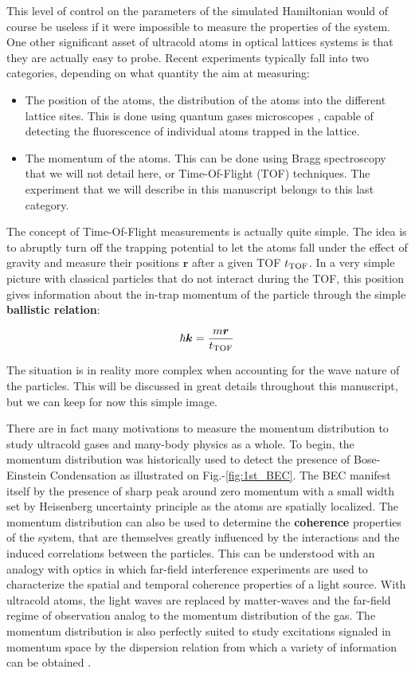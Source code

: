 This level of control on the parameters of the simulated Hamiltonian would of course be useless if it were impossible to measure the properties of the system. One other significant asset of ultracold atoms in optical lattices systems is that they are actually easy to probe. Recent experiments typically fall into two categories, depending on what quantity the aim at measuring:

\begin{itemize}
 \item The position of the atoms, \ie the distribution of the atoms into the different lattice sites. This is done using quantum gases microscopes \cite{bakr2009quantum}, capable of detecting the fluorescence of individual atoms trapped in the lattice.
 \item The momentum of the atoms. This can be done using Bragg spectroscopy \cite{stenger1999} that we will not detail here, or Time-Of-Flight (TOF) techniques. The experiment that we will describe in this manuscript belongs to this last category.
\end{itemize}

The concept of Time-Of-Flight measurements is actually quite simple. The idea is to abruptly turn off the trapping potential to let the atoms fall under the effect of gravity and measure their positions $\bm{r}$ after a given TOF $t_{\rm{TOF}}$. In a very simple picture with classical particles that do not interact during the TOF, this position gives information about the in-trap momentum of the particle through the simple \textbf{ballistic relation}:

\begin{equation}
    \hbar \bm{k} = \frac{m \bm{r}}{t_{\rm{TOF}}}
\end{equation}

\noindent The situation is in reality more complex when accounting for the wave nature of the particles. This will be discussed in great details throughout this manuscript, but we can keep for now this simple image.

There are in fact many motivations to measure the momentum distribution to study ultracold gases and many-body physics as a whole. To begin, the momentum distribution was historically used to detect the presence of Bose-Einstein Condensation as illustrated on Fig.-\ref{fig:1st_BEC}. The BEC manifest itself by the presence of sharp peak around zero momentum with a small width set by Heisenberg uncertainty principle as the atoms are spatially localized. The momentum distribution can also be used to determine the \textbf{coherence} properties of the system, that are themselves greatly influenced by the interactions and the induced correlations between the particles. This can be understood with an analogy with optics in which far-field interference experiments are used to characterize the spatial and temporal coherence properties of a light source. With ultracold atoms, the light waves are replaced by matter-waves and the far-field regime of observation analog to the momentum distribution of the gas. The momentum distribution is also perfectly suited to study excitations signaled in momentum space by the dispersion relation from which a variety of information can be obtained .


